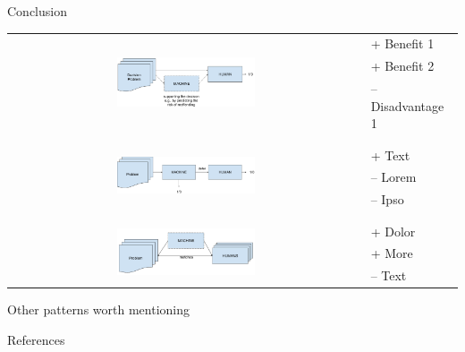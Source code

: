 \documentclass[11pt]{beamer}
\begin{document}
\begin{frame}{Conclusion}
\begin{table}[]
	\begin{tabular}{cl}
		\multirow{3}{*}{\includegraphics[width=0.4\textwidth]{Figures/human_decision.pdf}}&   + Benefit 1 		 \\
		& + Benefit 2\\
		& -- Disadvantage 1\\ 
		&\\
		\hline
		&\\
		\multirow{3}{*}{\includegraphics[width=0.4\textwidth]{Figures/defect.pdf}}&   	+ Text			\\
		& -- Lorem \\
		& -- Ipso \\
		&\\
		\hline
		&\\
		\multirow{3}{*}{\includegraphics[width=0.4\textwidth]{Figures/matching.pdf}}&   + Dolor				\\
		& + More \\
		& -- Text \\
	\end{tabular}
\end{table}
\end{frame}

\begin{frame}{Other patterns worth mentioning}
\end{frame}

\begin{frame}{References}


\end{frame}
\end{document}
